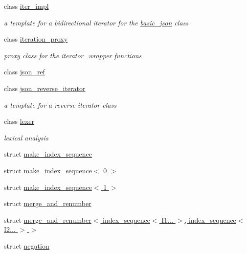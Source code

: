\begin{DoxyCompactItemize}
\item 
class \hyperlink{classnlohmann_1_1detail_1_1iter__impl}{iter\+\_\+impl}
\begin{DoxyCompactList}\small\item\em a template for a bidirectional iterator for the \hyperlink{classnlohmann_1_1basic__json}{basic\+\_\+json} class \end{DoxyCompactList}\item 
class \hyperlink{classnlohmann_1_1detail_1_1iteration__proxy}{iteration\+\_\+proxy}
\begin{DoxyCompactList}\small\item\em proxy class for the iterator\+\_\+wrapper functions \end{DoxyCompactList}\item 
class \hyperlink{classnlohmann_1_1detail_1_1json__ref}{json\+\_\+ref}
\item 
class \hyperlink{classnlohmann_1_1detail_1_1json__reverse__iterator}{json\+\_\+reverse\+\_\+iterator}
\begin{DoxyCompactList}\small\item\em a template for a reverse iterator class \end{DoxyCompactList}\item 
class \hyperlink{classnlohmann_1_1detail_1_1lexer}{lexer}
\begin{DoxyCompactList}\small\item\em lexical analysis \end{DoxyCompactList}\item 
struct \hyperlink{structnlohmann_1_1detail_1_1make__index__sequence}{make\+\_\+index\+\_\+sequence}
\item 
struct \hyperlink{structnlohmann_1_1detail_1_1make__index__sequence_3_010_01_4}{make\+\_\+index\+\_\+sequence$<$ 0 $>$}
\item 
struct \hyperlink{structnlohmann_1_1detail_1_1make__index__sequence_3_011_01_4}{make\+\_\+index\+\_\+sequence$<$ 1 $>$}
\item 
struct \hyperlink{structnlohmann_1_1detail_1_1merge__and__renumber}{merge\+\_\+and\+\_\+renumber}
\item 
struct \hyperlink{structnlohmann_1_1detail_1_1merge__and__renumber_3_01index__sequence_3_01I1_8_8_8_01_4_00_01inde4885d6f1d93a04f25932afbd429c4793}{merge\+\_\+and\+\_\+renumber$<$ index\+\_\+sequence$<$ I1... $>$, index\+\_\+sequence$<$ I2... $>$ $>$}
\item 
struct \hyperlink{structnlohmann_1_1detail_1_1negation}{negation}
\item 

\end{DoxyCompactItemize}
